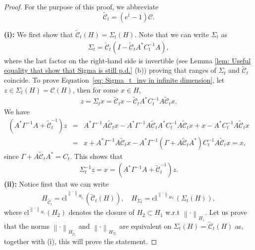 \documentclass[10pt]{article} %
\def\Eqref#1{Equation~\ref{#1}}
\theoremstyle{plain}
\theoremstyle{definition}
\theoremstyle{remark}
\newcommand{\norm}[1]{\left\|#1\right\|}
\newcommand{\C}{\mathcal C}
\newcommand{\cl}{\text{cl}}
\begin{document}
\begin{proof} 
For the purpose of this proof, we abbreviate
\begin{equation}\label{eq:abbrev_(e^t-1)C}
    \widetilde{\C}_t = (e^t-1) \C.
\end{equation}

{\bf (i):} We first show that $ \widetilde{\C}_t(H) = \Sigma_t(H)$.     Note that we can write $\Sigma_t$ as
    \begin{eqnarray*}
        \Sigma_t =  \widetilde{\C}_t\left( I -\widetilde{\C}_t A^*C_t^{-1}A \right),
    \end{eqnarray*}
    where the last factor on the right-hand side is invertible (see Lemma \ref{lem: Useful equality that show that Sigma is still p.d.} (b)) proving that ranges of $\Sigma_t$ and $\widetilde{\C}_t$ coincide. 
    To prove \Eqref{eq: Sigma_t_inv in infinite dimension}, let $z \in \Sigma_t(H) = \C(H)$, then for some $x\in H$, 
    \begin{eqnarray*}
        z = \Sigma_t x =  \widetilde{\C}_t x - \widetilde{\C}_t A^* C_t^{-1}A \widetilde{\C}_t x.
    \end{eqnarray*}
    We have
    \begin{eqnarray*}
        \left(A^* \Gamma^{-1} A  + \widetilde{\C}_t^{-1} \right)z & =&  A^* \Gamma^{-1} A \widetilde{\C}_t x -  A^* \Gamma^{-1} A \widetilde{\C}_t A^* C_t^{-1}A \widetilde{\C}_t x + x  - A^* C_t^{-1} A \widetilde{\C}_t x \\
        & =& x + A^* \Gamma^{-1}A \widetilde{\C}_t x - A^*\Gamma^{-1} \left(\Gamma + A \widetilde{\C}_t A^* \right) C_t^{-1}A\widetilde{\C}_t x = x,
    \end{eqnarray*}
    since $\Gamma + A \widetilde{\C}_t A^* = C_t$. This shows that
    \begin{eqnarray*}
        \Sigma_t^{-1}z = x = \left( A^*\Gamma^{-1}A  + \widetilde{\C}_t^{-1} \right)z.
    \end{eqnarray*}
{\bf (ii):} Notice first that we can write
    \begin{eqnarray*}\label{eq: funny way to write the CM space}
        H_{\widetilde{\C}_t} = \cl^{\norm{\cdot}_{H_{\widetilde{\C}_t}}}(\widetilde{\C}_t(H)), \quad H_{\Sigma_t} = \cl^{\norm{\cdot}_{H_{\Sigma_t}}}(\Sigma_t(H)),
    \end{eqnarray*}
    where $\cl^{\norm{\cdot}_{H_1}}(H_2)$ denotes the closure of $H_2\subset H_1$ w.r.t $\norm{\cdot}_{H_1}$. 
    Let us prove that the norms $\norm{\cdot}_{H_{\widetilde{\C}_t}} $ and $ \norm{\cdot}_{H_{\Sigma_t}}$ are equivalent on $\Sigma_t(H) = \widetilde{\C}_t(H)$ as, together with (i), this will prove the statement.
    

\end{proof}
\end{document}
